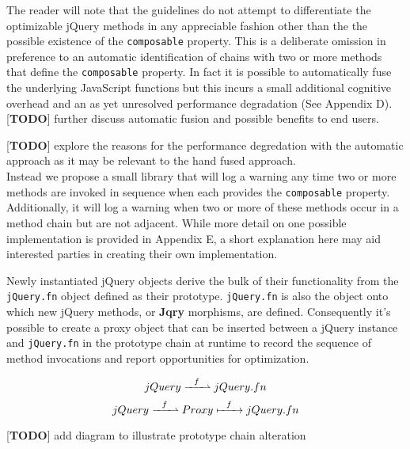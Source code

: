 \documentclass[preprint]{sigplanconf}
\begin{document}
The reader will note that the guidelines do not attempt to differentiate the optimizable jQuery methods in any appreciable fashion other than the the possible existence of the \verb|composable| property. This is a deliberate omission in preference to an automatic identification of chains with two or more methods that define the \verb|composable| property. In fact it is possible to automatically fuse the underlying JavaScript functions but this incurs a small additional cognitive overhead and an as yet unresolved performance degradation (See Appendix D).
\\

[\textbf{TODO}] further discuss automatic fusion and possible benefits to end users.

[\textbf{TODO}] explore the reasons for the performance degredation with the automatic approach as it may be relevant to the hand fused approach.
\\

Instead we propose a small library that will log a warning any time two or more methods are invoked in sequence when each provides the \verb|composable| property. Additionally, it will log a warning when two or more of these methods occur in a method chain but are not adjacent. While more detail on one possible implementation is provided in Appendix E, a short explanation here may aid interested parties in creating their own implementation.

Newly instantiated jQuery objects derive the bulk of their functionality from the \verb|jQuery.fn| object defined as their prototype. \verb|jQuery.fn| is also the object onto which new jQuery methods, or \textbf{Jqry} morphisms, are defined. Consequently it's possible to create a proxy object that can be inserted between a jQuery instance and \verb|jQuery.fn| in the prototype chain at runtime to record the sequence of method invocations and report opportunities for optimization.

\begin{figure}[!ht]
\begin{equation} \label{eq:jquery-default}
 jQuery \xrightharpoonup{\ \ f\ \ } jQuery.fn
\end{equation}
\begin{equation} \label{eq:jquery-with-proxy}
 jQuery \xrightharpoonup{\ \ f\ \ } Proxy \xmapsto{\ \ f\ \ } jQuery.fn
\end{equation}
\end{figure}

[\textbf{TODO}] add diagram to illustrate prototype chain alteration
\\
\end{document}
